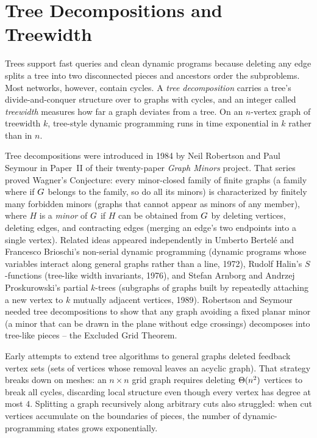 \chapter{Tree Decompositions and Treewidth}

Trees support fast queries and clean dynamic programs because deleting any edge
splits a tree into two disconnected pieces and ancestors order the subproblems.
Most networks, however, contain cycles. A \emph{tree decomposition} carries a
tree's divide-and-conquer structure over to graphs with cycles, and an integer
called \emph{treewidth} measures how far a graph deviates from a tree. On an
$n$-vertex graph of treewidth $k$, tree-style dynamic programming runs in time
exponential in $k$ rather than in $n$.

\begin{historybox}
Tree decompositions were introduced in 1984 by Neil Robertson and Paul Seymour in
Paper~II of their twenty-paper \emph{Graph Minors} project. That series
proved Wagner's Conjecture: every minor-closed family of finite graphs (a family where if $G$ belongs to the family, so do all its minors)
is characterized by finitely many forbidden minors (graphs that cannot appear as minors of any member), where $H$ is a \emph{minor} of $G$
if $H$ can be obtained from $G$ by deleting vertices, deleting edges, and
contracting edges (merging an edge's two endpoints into a single vertex). Related ideas appeared independently in
Umberto Bertel{\'e} and Francesco Brioschi's non-serial dynamic programming (dynamic programs whose variables interact along general graphs rather than a line, 1972),
Rudolf Halin's $S$-functions (tree-like width invariants, 1976), and Stefan Arnborg and
Andrzej Proskurowski's partial $k$-trees (subgraphs of graphs built by repeatedly attaching a new vertex to $k$ mutually adjacent vertices, 1989). Robertson and Seymour needed tree decompositions to show that
any graph avoiding a fixed planar minor (a minor that can be drawn in the plane without edge crossings) decomposes into tree-like pieces -- the Excluded Grid Theorem.

Early attempts to extend tree algorithms to general graphs deleted feedback vertex
sets (sets of vertices whose removal leaves an acyclic graph). That strategy breaks down on meshes:
an $n\times n$ grid graph requires deleting $\Theta(n^2)$ vertices to break all cycles, discarding
local structure even though every vertex has degree at most $4$. Splitting a graph recursively along arbitrary cuts also struggled: when cut vertices accumulate on the boundaries of pieces, the number of dynamic-programming states grows exponentially.


\end{historybox}
